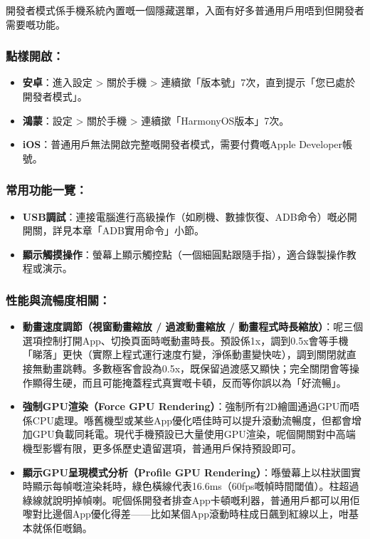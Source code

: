 


開發者模式係手機系統內置嘅一個隱藏選單，入面有好多普通用戶用唔到但開發者需要嘅功能。

\subsubsection*{點樣開啟：}

\begin{itemize}
  \item \textbf{安卓}：進入設定 > 關於手機 > 連續撳「版本號」7次，直到提示「您已處於開發者模式」。
  \item \textbf{鴻蒙}：設定 > 關於手機 > 連續撳「HarmonyOS版本」7次。
  \item \textbf{iOS}：普通用戶無法開啟完整嘅開發者模式，需要付費嘅Apple Developer帳號。
\end{itemize}

\subsubsection*{常用功能一覽：}

\begin{itemize}
  \item \textbf{USB調試}：連接電腦進行高級操作（如刷機、數據恢復、ADB命令）嘅必開開關，詳見本章「ADB實用命令」小節。
  \item \textbf{顯示觸摸操作}：螢幕上顯示觸控點（一個細圓點跟隨手指），適合錄製操作教程或演示。
\end{itemize}

\subsubsection*{性能與流暢度相關：}

\begin{itemize}
  \item \textbf{動畫速度調節（視窗動畫縮放 / 過渡動畫縮放 / 動畫程式時長縮放）}：呢三個選項控制打開App、切換頁面時嘅動畫時長。預設係1x，調到0.5x會等手機「睇落」更快（實際上程式運行速度冇變，淨係動畫變快咗），調到關閉就直接無動畫跳轉。多數極客會設為0.5x，既保留過渡感又顯快；完全關閉會等操作顯得生硬，而且可能掩蓋程式真實嘅卡頓，反而等你誤以為「好流暢」。
  \item \textbf{強制GPU渲染（Force GPU Rendering）}：強制所有2D繪圖通過GPU而唔係CPU處理。喺舊機型或某些App優化唔佳時可以提升滾動流暢度，但都會增加GPU負載同耗電。現代手機預設已大量使用GPU渲染，呢個開關對中高端機型影響有限，更多係歷史遺留選項，普通用戶保持預設即可。
  \item \textbf{顯示GPU呈現模式分析（Profile GPU Rendering）}：喺螢幕上以柱狀圖實時顯示每幀嘅渲染耗時，綠色橫線代表16.6ms（60fps嘅幀時間閾值）。柱超過綠線就說明掉幀喇。呢個係開發者排查App卡頓嘅利器，普通用戶都可以用佢嚟對比邊個App優化得差——比如某個App滾動時柱成日飆到紅線以上，咁基本就係佢嘅鍋。
\end{itemize}

